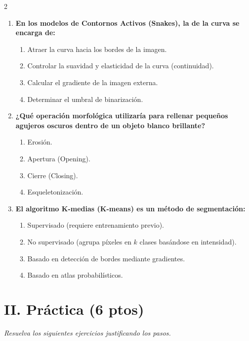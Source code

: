 \documentclass[a4paper,10pt]{extarticle}
\begin{document}
\begin{multicols*}{2}
\begin{enumerate}
    \item \textbf{En los modelos de Contornos Activos (Snakes), la  de la curva se encarga de:}
    \begin{enumerate}[label=\alph*)]
        \item Atraer la curva hacia los bordes de la imagen.
        \item Controlar la suavidad y elasticidad de la curva (continuidad).
        \item Calcular el gradiente de la imagen externa.
        \item Determinar el umbral de binarización.
    \end{enumerate}

    \item \textbf{¿Qué operación morfológica utilizaría para rellenar pequeños agujeros oscuros dentro de un objeto blanco brillante?}
    \begin{enumerate}[label=\alph*)]
        \item Erosión.
        \item Apertura (Opening).
        \item Cierre (Closing).
        \item Esqueletonización.
    \end{enumerate}

    \item \textbf{El algoritmo K-medias (K-means) es un método de segmentación:}
    \begin{enumerate}[label=\alph*)]
        \item Supervisado (requiere entrenamiento previo).
        \item No supervisado (agrupa píxeles en $k$ clases basándose en intensidad).
        \item Basado en detección de bordes mediante gradientes.
        \item Basado en atlas probabilísticos.
    \end{enumerate}

\end{enumerate}


\section*{II. Práctica (6 ptos)}
\textit{\footnotesize Resuelva los siguientes ejercicios justificando los pasos.}


\end{multicols*}
\end{document}
